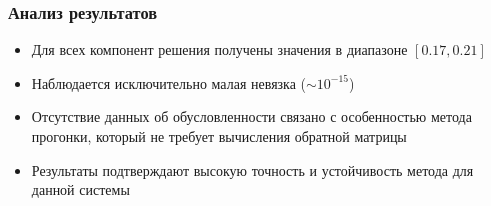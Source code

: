 \documentclass[12pt, a4paper]{article}
\begin{document}
\subsubsection*{Анализ результатов}
\begin{itemize}
\item Для всех компонент решения получены значения в диапазоне $[0.17, 0.21]$
\item Наблюдается исключительно малая невязка ($\sim 10^{-15}$)
\item Отсутствие данных об обусловленности связано с особенностью метода прогонки, 
      который не требует вычисления обратной матрицы
\item Результаты подтверждают высокую точность и устойчивость метода для данной системы
\end{itemize}
\end{document}
